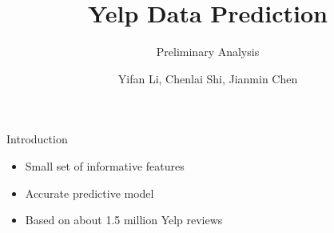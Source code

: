 \documentclass[10pt]{beamer}
\title{Yelp Data Prediction}
\subtitle{Preliminary Analysis}
\date{}
\author{Yifan Li, Chenlai Shi, Jianmin Chen}
\institute{Monday Group 1}
\begin{document}
\maketitle



\begin{frame}{Introduction}
\begin{itemize}
	\item Small set of informative features
	\item Accurate predictive model
	\item Based on about 1.5 million Yelp reviews
\end{itemize}
\end{frame}


\end{document}
